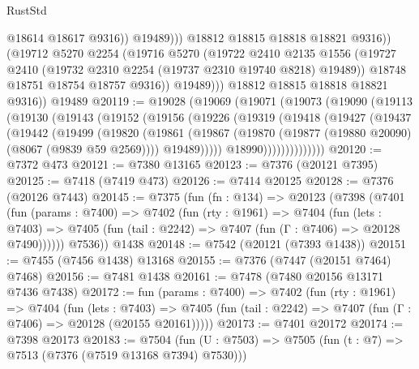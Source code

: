 \begin{lexlean}{RustStd}
\begin{coremodule}
                          @18614
                          @18617
                          @9316))
                      @19489)))
                @18812
                @18815
                @18818
                @18821
                @9316))
            (@19712
              @5270
              @2254
              (@19716
                @5270
                (@19722
                  @2410
                  @2135
                  @1556
                  (@19727 @2410 (@19732 @2310 @2254 (@19737 @2310 @19740 @8218) @19489))
                  @18748
                  @18751
                  @18754
                  @18757
                  @9316))
              @19489)))
        @18812
        @18815
        @18818
        @18821
        @9316))
    @19489
@20119 := @19028
    (@19069
      (@19071
        (@19073
          (@19090
            (@19113
              (@19130
                (@19143
                  (@19152
                    (@19156
                      (@19226
                        (@19319
                          (@19418
                            (@19427
                              (@19437
                                (@19442
                                  (@19499
                                    (@19820
                                      (@19861
                                        (@19867
                                          (@19870
                                            (@19877 (@19880 @20090) (@8067 (@9839 @59 @2569))))
                                          @19489)))))
                                @18990))))))))))))))
@20120 := @7372 @473
@20121 := @7380 @13165
@20123 := @7376 (@20121 @7395)
@20125 := @7418 (@7419 @473)
@20126 := @7414 @20125
@20128 := @7376 (@20126 @7443)
@20145 := @7375
    (fun (fn : @134) =>
    @20123
      (@7398
        (@7401
          (fun (params : @7400) =>
          @7402
            (fun (rty : @1961) =>
            @7404
              (fun (lets : @7403) =>
              @7405 (fun (tail : @2242) => @7407 (fun (Γ : @7406) => @20128 @7490))))))
        @7536))
    @1438
@20148 := @7542 (@20121 (@7393 @1438))
@20151 := @7455 (@7456 @1438) @13168
@20155 := @7376 (@7447 (@20151 @7464) @7468)
@20156 := @7481 @1438
@20161 := @7478 (@7480 @20156 @13171 @7436 @7438)
@20172 := fun (params : @7400) =>
  @7402
    (fun (rty : @1961) =>
    @7404
      (fun (lets : @7403) =>
      @7405 (fun (tail : @2242) => @7407 (fun (Γ : @7406) => @20128 (@20155 @20161)))))
@20173 := @7401 @20172
@20174 := @7398 @20173
@20183 := @7504
    (fun (U : @7503) => @7505 (fun (t : @7) => @7513 (@7376 (@7519 @13168 @7394) @7530)))

\end{coremodule}
\end{lexlean}
